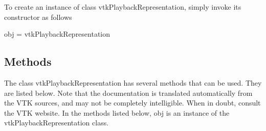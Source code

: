 To create an instance of class vtk\-Playback\-Representation, simply invoke its constructor as follows \begin{DoxyVerb}  obj = vtkPlaybackRepresentation
\end{DoxyVerb}
 \hypertarget{vtkwidgets_vtkxyplotwidget_Methods}{}\subsection{Methods}\label{vtkwidgets_vtkxyplotwidget_Methods}
The class vtk\-Playback\-Representation has several methods that can be used. They are listed below. Note that the documentation is translated automatically from the V\-T\-K sources, and may not be completely intelligible. When in doubt, consult the V\-T\-K website. In the methods listed below, {\ttfamily obj} is an instance of the vtk\-Playback\-Representation class. 
